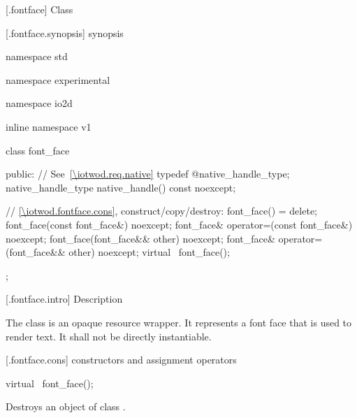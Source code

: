  [\iotwod.fontface] {Class }

 [\iotwod.fontface.synopsis] { synopsis}

\begin{codeblock}
namespace std { namespace experimental { namespace io2d { inline namespace v1 {
  class font_face {
  public:
    // See~\ref{\iotwod.req.native}
    typedef @\impdef@ native_handle_type;
    native_handle_type native_handle() const noexcept;

    // \ref{\iotwod.fontface.cons}, construct/copy/destroy:
    font_face() = delete;
    font_face(const font_face&) noexcept;
    font_face& operator=(const font_face&) noexcept;
    font_face(font_face&& other) noexcept;
    font_face& operator=(font_face&& other) noexcept;
    virtual ~font_face();
  };
} } } }
\end{codeblock}

 [\iotwod.fontface.intro] { Description}

\pnum
{}
The  class is an opaque resource wrapper. It represents a 
font face that is used to render text. It shall not be directly instantiable.

 [\iotwod.fontface.cons] { constructors and 
assignment operators}

\begin{itemdecl}
virtual ~font_face();
\end{itemdecl}
\begin{itemdescr}
	\pnum
	\effects
	Destroys an object of class .
	
\end{itemdescr}
